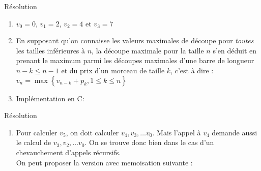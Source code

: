\documentclass[10pt]{beamer}
\begin{document}
\begin{frame}{\Ctitle}{\stitle}
	\begin{exampleblock}{Résolution}
		\begin{enumerate}
			\item<1-> \textcolor{OliveGreen}{\small $v_0=0$, $v_1=2$, $v_2 = 4$ et $v_3 = 7$ }
			\item<2-> \textcolor{OliveGreen}{\small En supposant qu'on connaisse les valeurs maximales de découpe pour \textit{toutes} les tailles inférieures à $n$, la découpe maximale pour la taille $n$ s'en déduit en prenant le maximum parmi les découpes maximales d'une barre de longueur $n-k \leq n-1$  et du prix d'un morceau de taille $k$, c'est à dire :
					$v_n = \max\left\{ v_{n-k} + p_{k},  1 \leq k \leq n\right\}$}
			\item<3-> \textcolor{OliveGreen}{\small Implémentation en C:}
		\end{enumerate}
	\end{exampleblock}
\end{frame}


\begin{frame}{\Ctitle}{\stitle}
	\begin{exampleblock}{Résolution}
		\begin{enumerate}
			\addtocounter{enumi}{3}
			\item Pour calculer $v_5$, on doit calculer $v_4, v_3, \dots v_0$. Mais l'appel à $v_4$ demande aussi le calcul de $v_3, v_2, \dots v_0$. On se trouve donc bien dans le cas d'un chevauchement d'appels récursifs. \\
			\medskip
			On peut proposer la version avec memoisation suivante :
		\end{enumerate}
	\end{exampleblock}
\end{frame}
\end{document}
